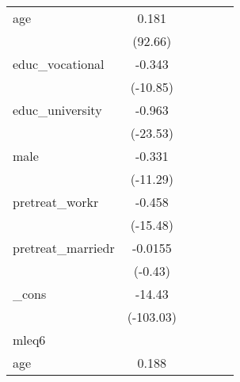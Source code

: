 {\begin{tabular}{l*{5}{c}}
age         &       0.181\sym{***}&                     &                     &                     &                     \\
            &     (92.66)         &                     &                     &                     &                     \\
[1em]
educ\_vocational&      -0.343\sym{***}&                     &                     &                     &                     \\
            &    (-10.85)         &                     &                     &                     &                     \\
[1em]
educ\_university&      -0.963\sym{***}&                     &                     &                     &                     \\
            &    (-23.53)         &                     &                     &                     &                     \\
[1em]
male        &      -0.331\sym{***}&                     &                     &                     &                     \\
            &    (-11.29)         &                     &                     &                     &                     \\
[1em]
pretreat\_workr&      -0.458\sym{***}&                     &                     &                     &                     \\
            &    (-15.48)         &                     &                     &                     &                     \\
[1em]
pretreat\_marriedr&     -0.0155         &                     &                     &                     &                     \\
            &     (-0.43)         &                     &                     &                     &                     \\
[1em]
\_cons      &      -14.43\sym{***}&                     &                     &                     &                     \\
            &   (-103.03)         &                     &                     &                     &                     \\
\hline
mleq6       &                     &                     &                     &                     &                     \\
age         &       0.188\sym{***}&                     &                     &                     &                     \\

\end{tabular}}
